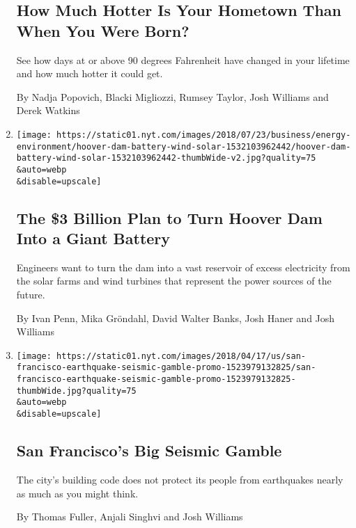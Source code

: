 \begin{enumerate}
{  \subsection{How Much Hotter Is Your Hometown Than When You Were
  Born?}\label{how-much-hotter-is-your-hometown-than-when-you-were-born}}

  See how days at or above 90 degrees Fahrenheit have changed in your
  lifetime and how much hotter it could get.

  By Nadja Popovich, Blacki Migliozzi, Rumsey Taylor, Josh Williams and
  Derek Watkins
\item
  \href{/interactive/2018/07/24/business/energy-environment/hoover-dam-renewable-energy.html}{}

  \texttt{[image: https://static01.nyt.com/images/2018/07/23/business/energy-environment/hoover-dam-battery-wind-solar-1532103962442/hoover-dam-battery-wind-solar-1532103962442-thumbWide-v2.jpg?quality=75\\\&auto=webp\\\&disable=upscale]}

  \hypertarget{the-3-billion-plan-to-turn-hoover-dam-into-a-giant-battery}{%
  \subsection{The \$3 Billion Plan to Turn Hoover Dam Into a Giant
  Battery}\label{the-3-billion-plan-to-turn-hoover-dam-into-a-giant-battery}}

  Engineers want to turn the dam into a vast reservoir of excess
  electricity from the solar farms and wind turbines that represent the
  power sources of the future.

  By Ivan Penn, Mika Gröndahl, David Walter Banks, Josh Haner and Josh
  Williams
\item
  \href{/interactive/2018/04/17/us/san-francisco-earthquake-seismic-gamble.html}{}

  \texttt{[image: https://static01.nyt.com/images/2018/04/17/us/san-francisco-earthquake-seismic-gamble-promo-1523979132825/san-francisco-earthquake-seismic-gamble-promo-1523979132825-thumbWide.jpg?quality=75\\\&auto=webp\\\&disable=upscale]}

  \hypertarget{san-franciscos-big-seismic-gamble}{%
  \subsection{San Francisco's Big Seismic
  Gamble}\label{san-franciscos-big-seismic-gamble}}

  The city's building code does not protect its people from earthquakes
  nearly as much as you might think.

  By Thomas Fuller, Anjali Singhvi and Josh Williams
\end{enumerate}

